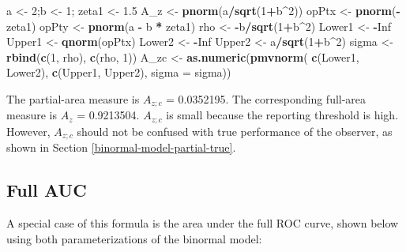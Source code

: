 \documentclass[
]{book}
\newenvironment{Shaded}{\begin{snugshade}}{\end{snugshade}}
\newcommand{\DataTypeTok}[1]{\textcolor[rgb]{0.13,0.29,0.53}{#1}}
\newcommand{\DecValTok}[1]{\textcolor[rgb]{0.00,0.00,0.81}{#1}}
\newcommand{\FloatTok}[1]{\textcolor[rgb]{0.00,0.00,0.81}{#1}}
\newcommand{\KeywordTok}[1]{\textcolor[rgb]{0.13,0.29,0.53}{\textbf{#1}}}
\newcommand{\NormalTok}[1]{#1}
\newcommand{\OperatorTok}[1]{\textcolor[rgb]{0.81,0.36,0.00}{\textbf{#1}}}
\newcommand{\OtherTok}[1]{\textcolor[rgb]{0.56,0.35,0.01}{#1}}
\newcommand{\StringTok}[1]{\textcolor[rgb]{0.31,0.60,0.02}{#1}}
\begin{document}
\begin{Shaded}
\begin{Highlighting}[numbers=left,,]
\NormalTok{a <-}\StringTok{ }\DecValTok{2}\NormalTok{;b <-}\StringTok{ }\DecValTok{1}\NormalTok{; zeta1 <-}\StringTok{ }\FloatTok{1.5}
\NormalTok{A_z <-}\StringTok{ }\KeywordTok{pnorm}\NormalTok{(a}\OperatorTok{/}\KeywordTok{sqrt}\NormalTok{(}\DecValTok{1}\OperatorTok{+}\NormalTok{b}\OperatorTok{^}\DecValTok{2}\NormalTok{))}
\NormalTok{opPtx <-}\StringTok{ }\KeywordTok{pnorm}\NormalTok{(}\OperatorTok{-}\NormalTok{zeta1)}
\NormalTok{opPty <-}\StringTok{ }\KeywordTok{pnorm}\NormalTok{(a }\OperatorTok{-}\StringTok{ }\NormalTok{b }\OperatorTok{*}\StringTok{ }\NormalTok{zeta1)}
\NormalTok{rho <-}\StringTok{ }\OperatorTok{-}\NormalTok{b}\OperatorTok{/}\KeywordTok{sqrt}\NormalTok{(}\DecValTok{1}\OperatorTok{+}\NormalTok{b}\OperatorTok{^}\DecValTok{2}\NormalTok{)}
\NormalTok{Lower1 <-}\StringTok{ }\OperatorTok{-}\OtherTok{Inf}
\NormalTok{Upper1 <-}\StringTok{ }\KeywordTok{qnorm}\NormalTok{(opPtx)}
\NormalTok{Lower2 <-}\StringTok{ }\OperatorTok{-}\OtherTok{Inf}
\NormalTok{Upper2 <-}\StringTok{ }\NormalTok{a}\OperatorTok{/}\KeywordTok{sqrt}\NormalTok{(}\DecValTok{1}\OperatorTok{+}\NormalTok{b}\OperatorTok{^}\DecValTok{2}\NormalTok{)}
\NormalTok{sigma <-}\StringTok{ }\KeywordTok{rbind}\NormalTok{(}\KeywordTok{c}\NormalTok{(}\DecValTok{1}\NormalTok{, rho), }\KeywordTok{c}\NormalTok{(rho, }\DecValTok{1}\NormalTok{))}
\NormalTok{A_zc <-}\StringTok{ }\KeywordTok{as.numeric}\NormalTok{(}\KeywordTok{pmvnorm}\NormalTok{(}
  \KeywordTok{c}\NormalTok{(Lower1, Lower2), }
  \KeywordTok{c}\NormalTok{(Upper1, Upper2), }
  \DataTypeTok{sigma =}\NormalTok{ sigma))}
\end{Highlighting}
\end{Shaded}

The partial-area measure is \(A_{z;c}\) = 0.0352195. The corresponding full-area measure is \(A_z\) = 0.9213504. \(A_{z;c}\) is small because the reporting threshold is high. However, \(A_{z;c}\) should not be confused with true performance of the observer, as shown in Section \ref{binormal-model-partial-true}.

\hypertarget{binormal-model-full-auc}{%
\subsection{Full AUC}\label{binormal-model-full-auc}}

A special case of this formula is the area under the full ROC curve, shown below using both parameterizations of the binormal model:
\end{document}
